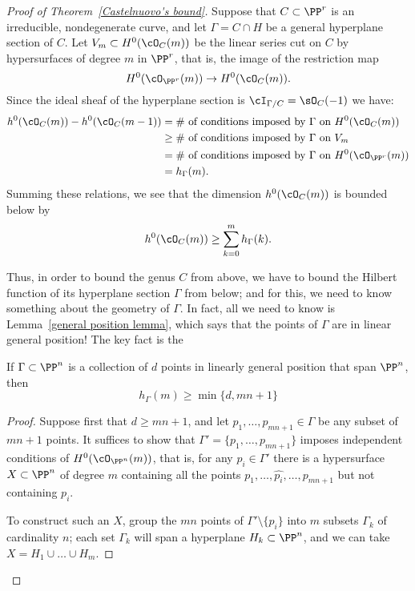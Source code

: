 \begin{proof}[Proof of Theorem~\ref{Castelnuovo's bound}]
Suppose that $C \subset \PP^r$ is an irreducible, nondegenerate curve, and let $\Gamma = C \cap H$ be a general hyperplane section of $C$. Let $V_m \subset H^0(\cO_C(m))$ be the linear series cut on $C$ by hypersurfaces of degree $m$ in $\PP^r$, that is, the image of the restriction map
$$
H^0(\cO_{\PP^r}(m)) \to H^0(\cO_C(m)).
$$
Since the ideal sheaf of the hyperplane section is $\cI_{\Gamma/C} = \sO_C(-1)$ we have:
\begin{align*}
h^0(\cO_C(m)) - h^0(\cO_C(m-1)) & = \text{\# of conditions imposed by $\Gamma$ on $H^0(\cO_C(m))$} \\
&\geq \text{\# of conditions imposed by $\Gamma$ on $V_m$} \\
&= \text{\# of conditions imposed by $\Gamma$ on $H^0(\cO_{\PP^r}(m))$} \\
&= h_\Gamma(m).
\end{align*}
Summing these relations, we see that the dimension $h^0(\cO_C(m))$ is bounded below by
$$
h^0(\cO_C(m)) \geq \sum_{k=0}^m h_\Gamma(k).
$$

Thus, in order to bound the genus $C$ from above, we have to bound the Hilbert function of its hyperplane section $\Gamma$  from below; and for this, we need to know something about the geometry of $\Gamma$. In fact, all we need to know is Lemma~\ref{general position lemma}, which says that the points of $\Gamma$ are in linear general position! The key fact is the

\begin{proposition}\label{min hilb}
If $\Gamma \subset \PP^n$ is a collection of $d$ points in linearly general position that span $\PP^n$, then 
$$
h_\Gamma(m) \geq \min\{d, mn+1\}
$$
\end{proposition}

\begin{proof}
Suppose first that $d \geq mn+1$, and let $p_1,\dots,p_{mn+1} \in \Gamma$ be any subset of $mn+1$ points. It suffices to show that $\Gamma' = \{p_1,\dots,p_{mn+1}\}$ imposes independent conditions of $H^0(\cO_{\PP^n}(m))$, that is, for any $p_i \in \Gamma'$ there is a hypersurface $X \subset \PP^n$ of degree $m$ containing all the points $p_1,\dots, \hat{p_i},\dots,p_{mn+1}$ but not containing $p_i$.

To construct such an $X$, group the $mn$ points of $\Gamma' \setminus \{p_i\}$ into $m$ subsets $\Gamma_k$ of cardinality $n$; each set $\Gamma_k$ will span a hyperplane $H_k \subset \PP^n$, and we can take $X = H_1 \cup \dots \cup H_m$. 


\end{proof}
\end{proof}

